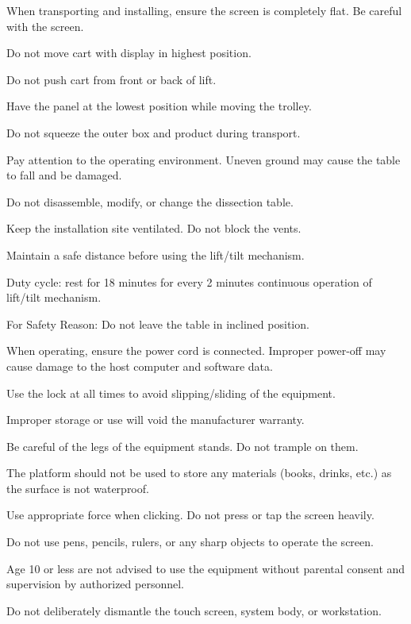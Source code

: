 \documentclass[11pt,a4paper]{article}
\begin{document}
\begin{tbkWarningList}
  \item When transporting and installing, ensure the screen is completely flat.
        Be careful with the screen.
  \item Do not move cart with display in highest position.
  \item Do not push cart from front or back of lift.
  \item Have the panel at the lowest position while moving the trolley.
  \item Do not squeeze the outer box and product during transport.
  \item Pay attention to the operating environment. Uneven ground may cause
        the table to fall and be damaged.
  \item Do not disassemble, modify, or change the dissection table.
  \item Keep the installation site ventilated. Do not block the vents.
  \item Maintain a safe distance before using the lift/tilt mechanism.
  \item Duty cycle: rest for 18 minutes for every 2 minutes continuous
        operation of lift/tilt mechanism.
  \item For Safety Reason: Do not leave the table in inclined position.
\end{tbkWarningList}


\begin{tbkWarningList}
  \item When operating, ensure the power cord is connected. Improper power-off
        may cause damage to the host computer and software data.
  \item Use the lock at all times to avoid slipping/sliding of the equipment.
  \item Improper storage or use will void the manufacturer warranty.
  \item Be careful of the legs of the equipment stands. Do not trample on them.
  \item The platform should not be used to store any materials (books, drinks, etc.)
        as the surface is not waterproof.
  \item Use appropriate force when clicking. Do not press or tap the screen heavily.
  \item Do not use pens, pencils, rulers, or any sharp objects to operate the screen.
  \item Age 10 or less are not advised to use the equipment without parental consent
        and supervision by authorized personnel.
  \item Do not deliberately dismantle the touch screen, system body, or workstation.
\end{tbkWarningList}
\end{document}
